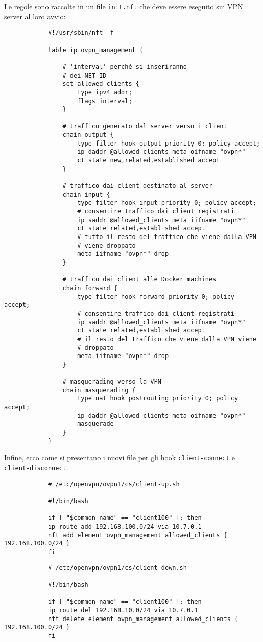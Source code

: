 		Le regole sono raccolte in un file \texttt{init.nft} che deve essere
		eseguito sui VPN server al loro avvio:
		\begin{verbatim}
			#!/usr/sbin/nft -f
			
			table ip ovpn_management {
					
				# 'interval' perché si inseriranno
				# dei NET ID
				set allowed_clients {
					type ipv4_addr;
					flags interval;
				}
					
				# traffico generato dal server verso i client
				chain output {
					type filter hook output priority 0; policy accept;
					ip daddr @allowed_clients meta oifname "ovpn*"
					ct state new,related,established accept
				}
					
				# traffico dai client destinato al server
				chain input {
					type filter hook input priority 0; policy accept;
					# consentire traffico dai client registrati
					ip saddr @allowed_clients meta iifname "ovpn*"
					ct state related,established accept
					# tutto il resto del traffico che viene dalla VPN
					# viene droppato
					meta iifname "ovpn*" drop
				}
					
				# traffico dai client alle Docker machines
				chain forward {
					type filter hook forward priority 0; policy accept;
					# consentire traffico dai client registrati
					ip saddr @allowed_clients meta iifname "ovpn*"
					ct state related,established accept
					# il resto del traffico che viene dalla VPN viene
					# droppato
					meta iifname "ovpn*" drop
				}
					
				# masquerading verso la VPN
				chain masquerading {
					type nat hook postrouting priority 0; policy accept;
					ip daddr @allowed_clients meta oifname "ovpn*"
					masquerade
				}
			}
		\end{verbatim}
		
		Infine, ecco come si presentano i nuovi file per gli hook \texttt{client-connect}
		e \texttt{client-disconnect}.
		
		\begin{verbatim}
			# /etc/openvpn/ovpn1/cs/client-up.sh
			
			#!/bin/bash
			
			if [ "$common_name" == "client100" ]; then
			ip route add 192.168.100.0/24 via 10.7.0.1
			nft add element ovpn_management allowed_clients { 192.168.100.0/24 }
			fi	
		\end{verbatim}
		
		\begin{verbatim}
			# /etc/openvpn/ovpn1/cs/client-down.sh
				
			#!/bin/bash
				
			if [ "$common_name" == "client100" ]; then
			ip route del 192.168.10.0/24 via 10.7.0.1
			nft delete element ovpn_management allowed_clients { 192.168.100.0/24 }
			fi	
		\end{verbatim}
		
				
				
				
